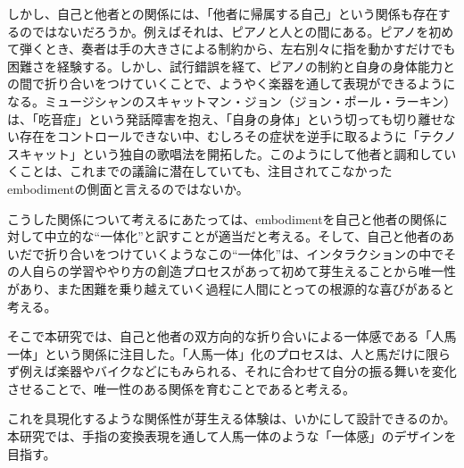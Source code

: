 
しかし、自己と他者との関係には、「他者に帰属する自己」という関係も存在するのではないだろうか。例えばそれは、ピアノと人との間にある。ピアノを初めて弾くとき、奏者は手の大きさによる制約から、左右別々に指を動かすだけでも困難さを経験する。しかし、試行錯誤を経て、ピアノの制約と自身の身体能力との間で折り合いをつけていくことで、ようやく楽器を通して表現ができるようになる。ミュージシャンのスキャットマン・ジョン（ジョン・ポール・ラーキン）は、「吃音症」という発話障害を抱え、「自身の身体」という切っても切り離せない存在をコントロールできない中、むしろその症状を逆手に取るように「テクノスキャット」という独自の歌唱法を開拓した。このようにして他者と調和していくことは、これまでの議論に潜在していても、注目されてこなかったembodimentの側面と言えるのではないか。

こうした関係について考えるにあたっては、embodimentを自己と他者の関係に対して中立的な``一体化''と訳すことが適当だと考える。そして、自己と他者のあいだで折り合いをつけていくようなこの``一体化''は、インタラクションの中でその人自らの学習ややり方の創造プロセスがあって初めて芽生えることから唯一性があり、また困難を乗り越えていく過程に人間にとっての根源的な喜びがあると考える。

そこで本研究では、自己と他者の双方向的な折り合いによる一体感である「人馬一体」という関係に注目した。「人馬一体」化のプロセスは、人と馬だけに限らず例えば楽器やバイクなどにもみられる、それに合わせて自分の振る舞いを変化させることで、唯一性のある関係を育むことであると考える。

これを具現化するような関係性が芽生える体験は、いかにして設計できるのか。本研究では、手指の変換表現を通して人馬一体のような「一体感」のデザインを目指す。




